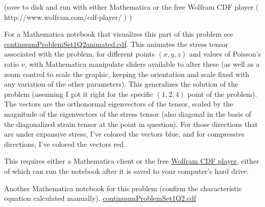 {(save to disk and run with either Mathematica or the free Wolfram CDF player ( http://www.wolfram.com/cdf-player/  ) )

For a Mathematica notebook that visualizes this part of this problem see \href{https://raw.github.com/peeterjoot/physicsplay/master/notes/phy454/mathematica/continuumProblemSet1Q2animated.cdf}{continuumProblemSet1Q2animated.cdf}.  This animates the stress tensor associated with the problem, for different points $(x,y,z)$ and values of Poisson's ratio $\nu$, with Mathematica manipulate sliders available to alter these (as well as a zoom control to scale the graphic, keeping the orientation and scale fixed with any variation of the other parameters).  This generalizes the solution of the problem (assuming I got it right for the specific $(1,2,4)$ point of the problem).  The vectors are the orthonormal eigenvectors of the tensor, scaled by the magnitude of the eigenvectors of the stress tensor (also diagonal in the basis of the diagonalized strain tensor at the point in question).  For those directions that are under expansive stress, I've colored the vectors blue, and for compressive directions, I've colored the vectors red.

This requires either a Mathematica client or the free \href{http://www.wolfram.com/cdf-player/}{Wolfram CDF player}, either of which can run the notebook after it is saved to your computer's hard drive.

Another Mathematica notebook for this problem (confirm the characteristic equation calculated manually).
\href{https://raw.github.com/peeterjoot/physicsplay/master/notes/phy454/mathematica/continuumProblemSet1Q2.cdf}{continuumProblemSet1Q2.cdf}
} %



